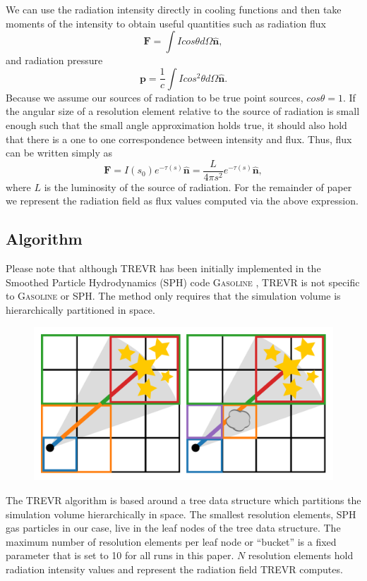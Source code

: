 \documentclass[fleq,usenatbib]{mnras}
\newcommand{\acro}{TREVR}
\begin{document}
We can use the radiation intensity directly in cooling functions and then take 
moments of the intensity to obtain useful quantities such as radiation flux 
\begin{equation}
\label{eq:flux}
\mathbf{F} = \int I cos\theta d\Omega \mathbf{\hat{n}},
\end{equation}
and radiation pressure
\begin{equation}
\label{eq:flux}
\mathbf{p} = \frac{1}{c}\int I cos^2\theta d\Omega \mathbf{\hat{n}}.
\end{equation}
Because we assume our sources of radiation to be true point sources, 
$cos\theta = 1$. If the angular size of a resolution element relative to the 
source of radiation is small enough such that the small angle approximation 
holds true, it should also hold that there is a one to one correspondence 
between intensity and flux. Thus, flux can be written simply as 
\begin{equation}
\label{eq:simpflux}
\mathbf{F} = I(s_0)e^{-\tau(s)} \mathbf{\hat{n}} = \frac{L}{4\pi s^2}
e^{-\tau(s)} \mathbf{\hat{n}},
\end{equation}
where $L$ is the luminosity of the source of radiation. For the remainder of 
paper we represent the radiation field as flux values computed via the above 
expression. 

\subsection{Algorithm}\label{sec:algo}
Please note that although \acro{} has been initially implemented in the 
Smoothed Particle Hydrodynamics (SPH) code \textsc{Gasoline} 
\citep{wadsleyEt03}, \acro{} is not specific to \textsc{Gasoline} or SPH. The 
method only requires that the simulation volume is hierarchically partitioned 
in space.
 
\begin{figure}
\includegraphics[width=1\linewidth]{Figures/algorithm.pdf}
\caption{}
\label{fig:algorithm}
\end{figure}
The \acro{} algorithm is based around a tree data structure which partitions 
the simulation volume hierarchically in space. The smallest resolution 
elements, SPH gas particles in our case, live in the leaf nodes of the tree
data structure. The maximum number of resolution elements per leaf node or 
``bucket'' is a fixed parameter that is set to 10 for all runs in this 
paper. $N$ resolution elements hold radiation intensity values and 
represent the radiation field \acro{} computes. 
\end{document}
